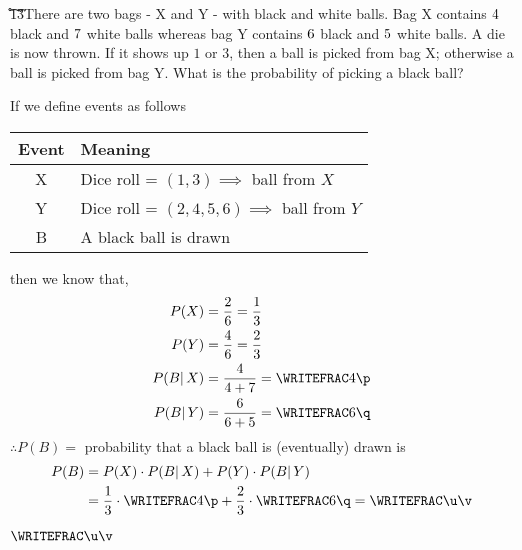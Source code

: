 


\ADD\va\vb\p
\ADD\vc\vd\q
\MULTIPLY{}\r
\FRACADD\va\p\r\q\s\t
\FRACMULT\s\t{1}{3}\u\v

\question[2] There are two bags - X and Y - with black and white balls. Bag X contains $4$ black 
and $7$ white balls whereas bag Y contains $6$ black and $5$ white balls. A die
is now thrown. If it shows up $1$ or $3$, then a ball is picked from bag X; otherwise a ball is picked
from bag Y. What is the probability of picking a black ball?

\watchout

\begin{solution}[\halfpage]
  If we define events as follows 

  \begin{tabular}{c l}
    \toprule 
      Event & Meaning \\
    \midrule
      X & Dice roll = $(1,3)\implies$ ball from $X$ \\ 
      Y & Dice roll = $(2,4,5,6)\implies$ ball from $Y$ \\ 
      B & A black ball is drawn \\ 
    \bottomrule 
  \end{tabular} 

  then we know that, 
	\begin{align}
		P(X) &= \dfrac{2}{6} = \dfrac{1}{3} \\
		P(Y) &= \dfrac{4}{6} = \dfrac{2}{3} \\
		P(B\vert\,X) &= \dfrac{\va}{\va+\vb} = \WRITEFRAC\va\p \\
		P(B\vert\,Y) &= \dfrac{\vc}{\vc+\vd} = \WRITEFRAC\vc\q
	\end{align}
	$\therefore P(B) = $ probability that a black ball is (eventually) drawn is
	\begin{align}
		P(B) &= P(X)\cdot P(B\vert\,X) + P(Y)\cdot P(B\vert\, Y) \\
		&= \dfrac{1}{3}\cdot\WRITEFRAC\va\p + \dfrac{2}{3}\cdot\WRITEFRAC\vc\q = \WRITEFRAC\u\v
	\end{align}
\end{solution}

\ifprintanswers\begin{codex}$\WRITEFRAC\u\v$\end{codex}\fi
